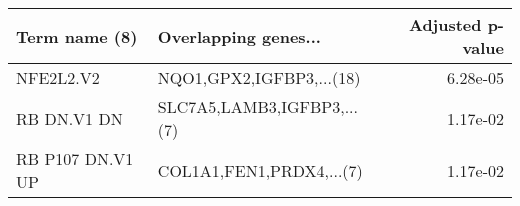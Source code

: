 \begin{tabular}{llr}
\toprule
   Term name (8) &       Overlapping genes... &  Adjusted p-value \\
\midrule
       NFE2L2.V2 &   NQO1,GPX2,IGFBP3,...(18) &          6.28e-05 \\
     RB DN.V1 DN & SLC7A5,LAMB3,IGFBP3,...(7) &          1.17e-02 \\
RB P107 DN.V1 UP &   COL1A1,FEN1,PRDX4,...(7) &          1.17e-02 \\
\bottomrule
\end{tabular}
